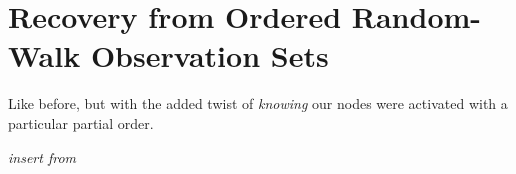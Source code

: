 \documentclass[%
	12pt,
		oneside,
		letterpaper
]{book}
\begin{document}

\chapter{Recovery from Ordered Random-Walk Observation
Sets}\label{recovery-from-ordered-random-walk-observation-sets}

Like before, but with the added twist of \emph{knowing} our nodes were
activated with a particular partial order.

\emph{insert from
\autocite{OrganizingTaggedKnowledge_Sexton2020,UsingSemanticFluency_Sexton2019}}



\printbibliography[title=References]
\end{document}
